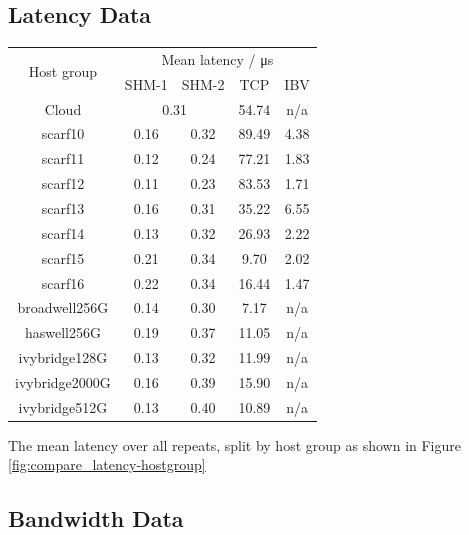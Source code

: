 \documentclass{article}
\begin{document}
    \subsection{Latency Data}
        \label{appendix:latency-data}

        \begin{center}
            \centering
            \begin{tabular}{ |c||c|c|c|c|  }
             \hline
             \multirow{2}{*}{Host group} & \multicolumn{4}{c|}{Mean latency / \si{\micro\second}} \\
             \cline{2-5}
                                      & SHM-1 & SHM-2 & TCP & IBV\\
             \hline
                Cloud & \multicolumn{2}{c|}{0.31} & 54.74 & n/a\\
                scarf10 & 0.16 & 0.32 & 89.49 & 4.38\\
                scarf11 & 0.12 & 0.24 & 77.21 & 1.83\\
                scarf12 & 0.11 & 0.23 & 83.53 & 1.71\\
                scarf13 & 0.16 & 0.31 & 35.22 & 6.55\\
                scarf14 & 0.13 & 0.32 & 26.93 & 2.22\\
                scarf15 & 0.21 & 0.34 & 9.70 & 2.02\\
                scarf16 & 0.22 & 0.34 & 16.44 & 1.47\\
                broadwell256G & 0.14 & 0.30 & 7.17 & n/a\\
                haswell256G & 0.19 & 0.37 & 11.05 & n/a\\
                ivybridge128G & 0.13 & 0.32 & 11.99 & n/a\\
                ivybridge2000G & 0.16 & 0.39 & 15.90 & n/a\\
                ivybridge512G & 0.13 & 0.40 & 10.89 & n/a\\

             \hline
            \end{tabular}
            \captionsetup{type=table}
            \caption{The mean latency over all repeats, split by host group as shown in Figure \ref{fig:compare_latency-hostgroup}}
        \end{center}






    \subsection{Bandwidth Data}
        \label{appendix:bandwidth-data}
\end{document}
